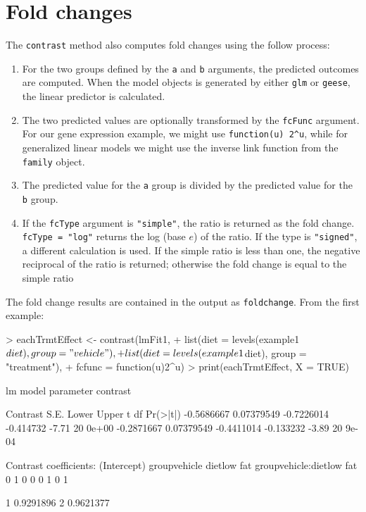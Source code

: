 \documentclass[12pt]{article}
\newcommand{\code}[1]{\mbox{\footnotesize\color{darkblue}\texttt{#1}}}
\renewenvironment{Schunk}{\vspace{\topsep}}{\vspace{\topsep}}
\begin{document}
\section{Fold changes}

The \code{contrast} method also computes fold changes using the follow process:

\begin{enumerate}
\item For the two groups defined by the \code{a} and \code{b} arguments, the predicted outcomes are computed. When the model objects is generated by either \code{glm} or \code{geese}, the linear predictor is calculated.
\item The two predicted values are optionally transformed by the \code{fcFunc} argument. For our gene expression example, we might use \verb+function(u) 2^u+, while for generalized linear models we might use the inverse link function from the \code{family} object. 
\item The predicted value for the \code{a} group is divided by the predicted value for the \code{b} group.
\item If the \code{fcType} argument is \code{"simple"}, the ratio is returned as the fold change. \code{fcType = "log"} returns the log (base $e$) of the ratio. If the type is \code{"signed"}, a different calculation is used. If the simple ratio is less than one, the negative reciprocal of the ratio is returned; otherwise the fold change is equal to the simple ratio
\end{enumerate}

The fold change results are contained in the output as \code{foldchange}. From the first example:
\begin{Schunk}
\begin{Sinput}
> eachTrmtEffect <- contrast(lmFit1, 
+                            list(diet = levels(example1$diet), group = "vehicle"),
+                            list(diet = levels(example1$diet), group = "treatment"),
+                            fcfunc = function(u)2^u)  
> print(eachTrmtEffect, X = TRUE)
\end{Sinput}
\begin{Soutput}
lm model parameter contrast

   Contrast       S.E.      Lower     Upper     t df Pr(>|t|)
 -0.5686667 0.07379549 -0.7226014 -0.414732 -7.71 20    0e+00
 -0.2871667 0.07379549 -0.4411014 -0.133232 -3.89 20    9e-04

Contrast coefficients:
 (Intercept) groupvehicle dietlow fat groupvehicle:dietlow fat
           0            1           0                        0
           0            1           0                        1
\end{Soutput}
\begin{Soutput}
       [,1]
1 0.9291896
2 0.9621377
\end{Soutput}
\end{Schunk}
\end{document}
